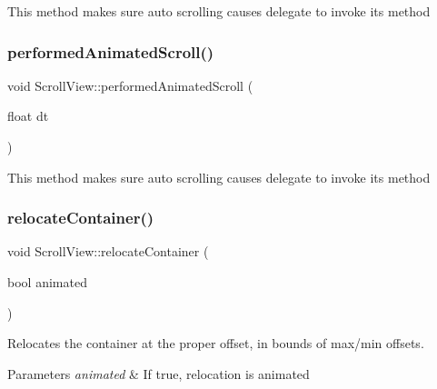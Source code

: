 This method makes sure auto scrolling causes delegate to invoke its method \mbox{\label{classScrollView_ac3f32e65ea62a4322c37da1316ebc110}} 
\subsubsection{\texorpdfstring{performed\+Animated\+Scroll()}{performedAnimatedScroll()}\hspace{0.1cm}{\footnotesize\ttfamily [2/2]}}
{\footnotesize\ttfamily void Scroll\+View\+::performed\+Animated\+Scroll (\begin{DoxyParamCaption}\item[{float}]{dt }\end{DoxyParamCaption})\hspace{0.3cm}{\ttfamily [protected]}}

This method makes sure auto scrolling causes delegate to invoke its method \mbox{\label{classScrollView_a2c4fd75c5fd7f66cfaec50553d2efa69}} 
\subsubsection{\texorpdfstring{relocate\+Container()}{relocateContainer()}\hspace{0.1cm}{\footnotesize\ttfamily [1/2]}}
{\footnotesize\ttfamily void Scroll\+View\+::relocate\+Container (\begin{DoxyParamCaption}\item[{bool}]{animated }\end{DoxyParamCaption})\hspace{0.3cm}{\ttfamily [protected]}}

Relocates the container at the proper offset, in bounds of max/min offsets.


\begin{DoxyParams}{Parameters}
{\em animated} & If true, relocation is animated \\
\hline
\end{DoxyParams}
\mbox{\label{classScrollView_a2c4fd75c5fd7f66cfaec50553d2efa69}} 
